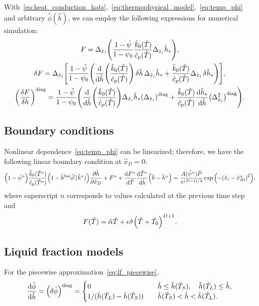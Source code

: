 \documentclass{article}
\newcommand{\dder}[2][]{\Delta_{#2}#1}
\newcommand{\diag}[1]{\qty(#1)^\mathrm{diag}}
\newcommand{\fusion}[1]{{#1}^\mathrm{fus}}
\newcommand{\Hx}{\hat{x}}
\newcommand{\Hh}{\hat{h}}
\newcommand{\HT}{\hat{T}}
\newcommand{\HP}{\hat{P}}
\newcommand{\Halpha}{\hat{\alpha}}
\newcommand{\Hsigma}{\hat{\sigma}}
\newcommand{\Hc}{\hat{c}}
\newcommand{\Hk}{\hat{k}}
\newcommand{\Hphi}{\hat{\phi}}
\newcommand{\Hpsi}{\hat{\psi}}
\begin{document}
With~\eqref{eq:heat_conduction_hats},~\eqref{eq:thermophysical_model},~\eqref{eq:temp_phi}
and arbitrary \(\Hphi(\Hh)\), we can employ the following expressions for numerical simulation:
\begin{gather}
    F = \dder{\Hx_i}\qty(
        \frac{1 - \Hpsi}{1 - \psi_0} \frac{\Hk_0(\HT)}{\Hc_p(\HT)} \dder[\Hh_*]{\Hx_i}
	), \\
    \var{F} = \dder{\Hx_i}\qty[ \frac{1 - \Hpsi}{1 - \psi_0} \qty(
	    \dv{\Hh}(\frac{\Hk_0(\HT)}{\Hc_p(\HT)})\var{\Hh}\dder[\Hh_*]{\Hx_i} +
	    \frac{\Hk_0(\HT)}{\Hc_p(\HT)} \dder[\var{\Hh_*}]{\Hx_i}
	)], \\
    \diag{\fdv{F}{h}} = \frac{1 - \Hpsi}{1 - \psi_0} \qty(
	    \dv{\Hh}(\frac{\Hk_0(\HT)}{\Hc_p(\HT)})\dder[\Hh_*]{\Hx_i} \diag{\dder{\Hx_i}} +
	    \frac{\Hk_0(\HT)}{\Hc_p(\HT)}\dv{\Hh_*}{\Hh} \diag{\dder{\Hx_i}^2}
	).
\end{gather}

\subsection{Boundary conditions}

Nonlinear dependence~\eqref{eq:temp_phi} can be linearized; therefore, we have the following linear boundary condition at \(\Hx_D=0\):
\begin{equation}\label{eq:bc_linearized}
    \qty(1 - \Hpsi^n) \frac{\Hk_0(\HT^n)}{\Hc_p(\HT^n)} \qty(1-\fusion{\Hh}\hat\phi'(\Hh^n))\pdv{\Hh}{\Hx_D} +
	    F^n + \dv{F^n}{\HT}\dv{\HT^n}{\Hh}\qty(\Hh - \Hh^n) =
	    \frac{A(\Hpsi^n)\HP}{\pi^{(D-1)/2}}\exp\qty( -\qty(\Hx_i-\Hx_{Bi}^n)^2 ),
\end{equation}
where superscript \(n\) corresponds to values calculated at the previous time step and
\begin{equation}\label{eq:bc_Dirichlet_part}
    F(\HT) = \Halpha\HT + \epsilon\Hsigma\qty(\HT + \HT_0)^{D+1}.
\end{equation}

\subsection{Liquid fraction models}

For the piecewise approximation~\eqref{eq:lf_piecewise},
\begin{equation}
	\dv{\Hphi}{\Hh} = \diag{\var{\Hphi}} = \begin{cases}
        0 & \quad \Hh \leq \Hh(\HT_S), \quad \Hh(\HT_L) \leq \Hh, \\
        1/(\Hh(\HT_L)-\Hh(\HT_S)) & \quad \Hh(\HT_S) < \Hh < \Hh(\HT_L). \\
    \end{cases} \label{eq:pert_phi_h_diag}
\end{equation}
\end{document}
